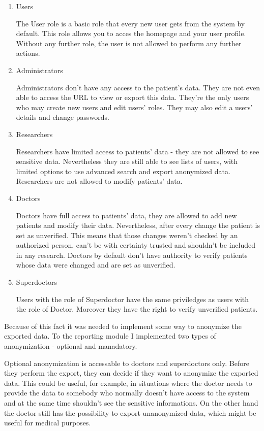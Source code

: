 \documentclass[thesis=B,english]{FITthesis}[2012/10/20]
\begin{document}
	\begin{enumerate}
	\item{Users}
	
	The User role is a basic role that every new user gets from the system by default. This role allows you to acces the homepage 	and your user profile. Without any further role, the user is not allowed to perform any further actions.

	\item{Administrators}

	Administrators don't have any access to the patient's data. They are not even able to access the URL to view or export this data. They're the only users who may create new users and edit users' roles. They may also edit a users' details and change passwords.
	\item{Researchers}

	Researchers have limited access to patients' data - they are not allowed to see sensitive data. Nevertheless they are still able to see lists of users, with limited options to use advanced search and export anonymized data. Researchers are not allowed to modify patients' data.
	\item{Doctors}

	Doctors have full access to patients' data, they are allowed to add new patients and modify their data. Nevertheless, after every change the patient is set as unverified. This means that those changes weren't checked by an authorized person, can't be with certainty trusted and shouldn't be included in any research. Doctors by default don't have authority to verify patients whose data were changed and are set as unverified.

	\item{Superdoctors}

	Users with the role of Superdoctor have the same priviledges as users with the role of Doctor. Moreover they have the right to verify unverified patients.

	\end{enumerate}

Because of this fact it was needed to implement some way to anonymize the exported data. To the reporting module I implemented two types of anonymization - optional and manadatory.

Optional anonymization is accessable to doctors and superdoctors only. Before they perform the export, they can decide if they want to anonymize the exported data. This could be useful, for example, in situations where the doctor needs to provide the data to somebody who normally doesn't have access to the system and at the same time shouldn't see the sensitive informations. On the other hand the doctor still has the possibility to export unanonymized data, which might be useful for medical purposes.
\end{document}
